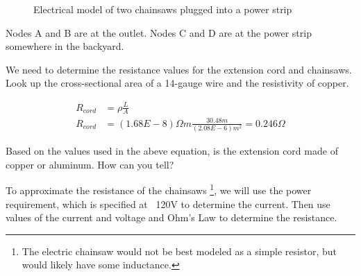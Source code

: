 \begin{figure}[H]
\begin{center}
\caption{Electrical model of two chainsaws plugged into a power strip}
\end{center}
\end{figure}

Nodes A and B are at the outlet. Nodes C and D are at the power strip somewhere in the backyard.
\par
We need to determine the resistance values for the extension cord and chainsaws. Look up the cross-sectional area of a 14-gauge wire and the resistivity of copper.
\par
\begin{align*}
R_{cord} &= \rho \frac{L}{A}\\
R_{cord}&=(1.68E-8) \Omega m \frac{30.48 m}{(2.08E-6) m^2} = 0.246 \Omega
\end{align*}

\begin{blevel}
Based on the values used in the abeve equation, is the extension cord made of copper or aluminum. How can you tell? 
\end{blevel}

To approximate the resistance of the chainsaws \footnote{The electric chainsaw would not be best modeled as a simple resistor, but would likely have some inductance.}, we will use the power requirement, which is specified at ~120V to determine the current. Then use values of the current and voltage and Ohm's Law to determine the resistance.
\par


